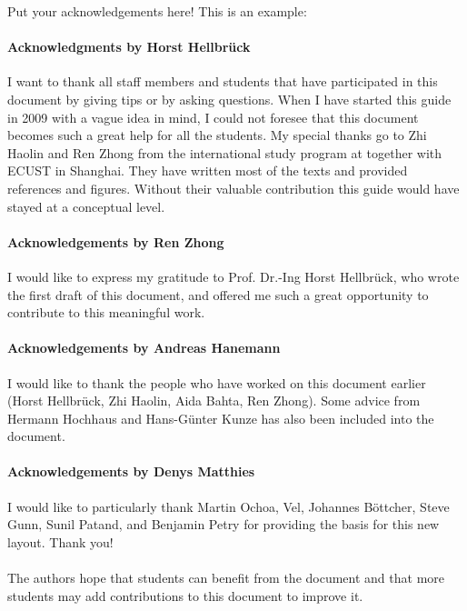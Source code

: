 
\begin{acknowledgements}
\addchaptertocentry{\acknowledgementname}
Put your acknowledgements here! This is an example:
    
    \paragraph{Acknowledgments by Horst Hellbrück}
    I want to thank all staff members and students that have participated in this document by giving tips or by asking questions. When I have started this guide in 2009 with a vague idea in mind, I could not foresee that this document becomes such a great help for all the students. My special thanks go to Zhi Haolin and Ren Zhong from the international study program \programname{} at \universityname{} together with ECUST in Shanghai. They have written most of the texts and provided references and figures. Without their valuable contribution this guide would have stayed at a conceptual level.
    
    \paragraph{Acknowledgements by Ren Zhong}
    I would like to express my gratitude to Prof. Dr.-Ing Horst Hellbrück, who wrote the first draft of this document, and offered me such a great opportunity to contribute to this meaningful work.
    
    \paragraph{Acknowledgements by Andreas Hanemann}
    I would like to thank the people who have worked on this document earlier (Horst Hellbrück, Zhi Haolin, Aida Bahta, Ren Zhong). Some advice from Hermann Hochhaus and Hans-Günter Kunze has also been included into the document.
    
    \paragraph{Acknowledgements by Denys Matthies}
    I would like to particularly thank Martin Ochoa, Vel, Johannes Böttcher, Steve Gunn, Sunil Patand, and Benjamin Petry for providing the basis for this new layout. Thank you!
    
    \paragraph{} The authors hope that students can benefit from the document and that more students may add contributions to this document to improve it.


\end{acknowledgements}

